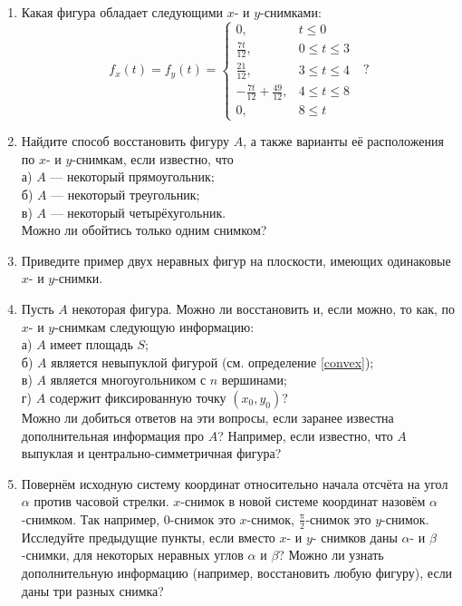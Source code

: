 \begin{enumerate}
\item Какая фигура обладает следующими $x$- и $y$-снимками:
$$f_x(t)= f_y(t)=\begin{cases}
0, &t\leq 0\\
\tfrac{7t}{12}, &0\leq t\leq 3\\
\tfrac{21}{12}, &3\leq t\leq 4\\
-\tfrac{7t}{12}+ \tfrac{49}{12},&4\leq t\leq 8\\
0,& 8\leq t
\end{cases} \,\,\,\,?$$

\item Найдите способ восстановить фигуру $A$, а также варианты её расположения по $x$- и $y$-снимкам, если известно, что \\
а) $A$ --- некоторый прямоугольник;\\
б) $A$ --- некоторый треугольник;\\
в) $A$ --- некоторый четырёхугольник.\\
Можно ли обойтись только одним снимком?

\item Приведите пример двух неравных фигур на плоскости, имеющих одинаковые $x$- и $y$-снимки.
\item Пусть $A$ некоторая фигура. Можно ли восстановить и, если можно, то как, по $x$- и $y$-снимкам следующую информацию:\\
а) $A$ имеет площадь $S$;\\
б) $A$ является невыпуклой фигурой (см. определение \ref{convex}); \\
в) $A$ является многоугольником с $n$ вершинами;\\
г) $A$ содержит фиксированную точку $(x_0,y_0)$?\\
Можно ли добиться ответов на эти вопросы, если заранее известна дополнительная информация про $A$? Например, если известно, что $A$ выпуклая и центрально-симметричная фигура?
\item Повернём исходную систему координат относительно начала отсчёта на угол $\alpha$ против часовой стрелки. $x$-снимок в новой  системе координат назовём $\alpha$-снимком. Так например, $0$-снимок это $x$-снимок, $\frac{\text{π}}{2}$-снимок это $y$-снимок.
Исследуйте предыдущие пункты, если вместо $x$- и $y$- снимков даны $\alpha$- и $\beta$-снимки, для некоторых неравных углов $\alpha$ и $\beta$? Можно ли узнать дополнительную информацию (например, восстановить любую фигуру), если даны три разных снимка?
\end{enumerate}


